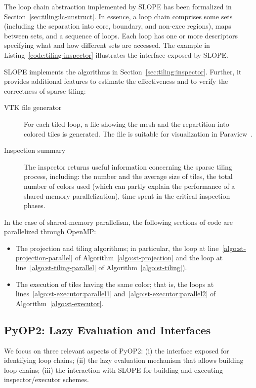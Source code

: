 The loop chain abstraction implemented by SLOPE has been formalized in Section~\ref{sec:tiling:lc-unstruct}. In essence, a loop chain comprises some sets (including the separation into core, boundary, and non-exec regions), maps between sets, and a sequence of loops. Each loop has one or more descriptors specifying what and how different sets are accessed. The example in Listing~\ref{code:tiling-inspector} illustrates the interface exposed by SLOPE. 

SLOPE implements the algorithms in Section~\ref{sec:tiling:inspector}. Further, it provides additional features to estimate the effectiveness and to verify the correctness of sparse tiling:
\begin{description}
\item[VTK file generator] For each tiled loop, a file showing the mesh and the repartition into colored tiles is generated. The file is suitable for visualization in Paraview~\citep{paraview}.
\item[Inspection summary] The inspector returns useful information concerning the sparse tiling process, including: the number and the average size of tiles, the total number of colors used (which can partly explain the performance of a shared-memory parallelization), time spent in the critical inspection phases. 
\end{description}

In the case of shared-memory parallelism, the following sections of code are parallelized through OpenMP:
\begin{itemize}
\item The projection and tiling algorithms; in particular, the loop at line~\ref{algo:st-projection-parallel} of Algorithm~\ref{algo:st-projection} and the loop at line~\ref{algo:st-tiling-parallel} of Algorithm~\ref{algo:st-tiling}).
\item The execution of tiles having the same color; that is, the loops at lines~\ref{algo:st-executor:parallel1} and~\ref{algo:st-executor:parallel2} of Algorithm~\ref{algo:st-executor}.
\end{itemize}


\subsection{PyOP2: Lazy Evaluation and Interfaces}
\label{sec:tiling:lcinterface}
We focus on three relevant aspects of PyOP2: (i) the interface exposed for identifying loop chains; (ii) the lazy evaluation mechanism that allows building loop chains; (iii) the interaction with SLOPE for building and executing inspector/executor schemes.


